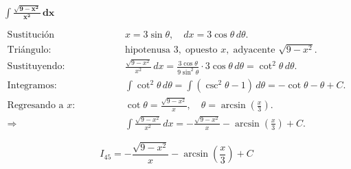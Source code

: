 $\displaystyle \mathbf{\int \frac{\sqrt{9-x^{2}}}{x^{2}}\,dx}$

\nopagebreak
$$
\begin{aligned}
\text{Sustitución trigonométrica: } &
x = 3\sin\theta, \quad dx = 3\cos\theta\,d\theta. \\[4pt]
\text{Triángulo: } &
\text{hipotenusa } 3,\; \text{opuesto } x,\; \text{adyacente } \sqrt{9-x^{2}}. \\[6pt]
\text{Sustituyendo: } &
\frac{\sqrt{9-x^{2}}}{x^{2}}\,dx
= \frac{3\cos\theta}{9\sin^{2}\theta}\cdot 3\cos\theta\,d\theta
= \cot^{2}\theta\,d\theta. \\[6pt]
\text{Integramos: } &
\int \cot^{2}\theta\,d\theta
= \int (\csc^{2}\theta - 1)\,d\theta
= -\cot\theta - \theta + C. \\[6pt]
\text{Regresando a } x: &
\cot\theta = \frac{\sqrt{9-x^{2}}}{x}, \quad 
\theta = \arcsin\!\left(\frac{x}{3}\right). \\[4pt]
\Rightarrow &
\int \frac{\sqrt{9-x^{2}}}{x^{2}}\,dx
= -\frac{\sqrt{9-x^{2}}}{x} - \arcsin\!\left(\frac{x}{3}\right) + C.
\end{aligned}
$$

$$
\boxed{\displaystyle 
I_{45} = -\frac{\sqrt{9-x^{2}}}{x} - \arcsin\!\left(\frac{x}{3}\right) + C}
$$
